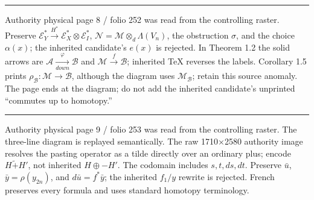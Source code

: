 \documentclass[
  english,
  a3paper,
  a3paper]{extarticle}
\begin{document}


\par

\vspace{0.7mm}\hrule\vspace{1.6mm}

\fontsize{11}{14}\selectfont

Authority physical page 8 / folio 252 was read from the controlling
raster. Preserve
\(\mathscr E_Y^*\xrightarrow{H^*}\mathscr E_X^*\otimes\mathscr E_I^*\),
\(\mathcal N=\mathcal M\otimes_d\Lambda(V_n)\), the obstruction
\(\sigma\), and the choice \(\alpha(x)\); the inherited candidate's
\(e(x)\) is rejected. In Theorem 1.2 the solid arrows are
\(\mathscr A\xrightarrow[down]{\varphi}\mathscr B\) and
\(\mathcal M\xrightarrow{f}\mathscr B\); inherited TeX reverses the
labels. Corollary 1.5 prints
\(\rho_{\mathscr B}:\mathcal M\to\mathscr B\), although the diagram uses
\(\mathcal M_{\mathscr B}\); retain this source anomaly. The page ends
at the diagram; do not add the inherited candidate's unprinted
``commutes up to homotopy.''

\clearpage



\par

\vspace{0.7mm}\hrule\vspace{1.6mm}

\fontsize{11}{14}\selectfont

Authority physical page 9 / folio 253 was read from the controlling
raster. The three-line diagram is replayed semantically. The raw
1710×2580 authority image resolves the pasting operator as a tilde
directly over an ordinary plus; encode \(H\mathrel{\widetilde{+}}H'\),
not inherited \(H\oplus-H'\). The codomain includes \(s,t,ds,dt\).
Preserve \(\bar u\), \(\bar y=\rho(y_{2n})\), and \(d\bar u=f^*\bar y\);
the inherited \(f_1/y\) rewrite is rejected. French preserves every
formula and uses standard homotopy terminology.

\clearpage


\end{document}

